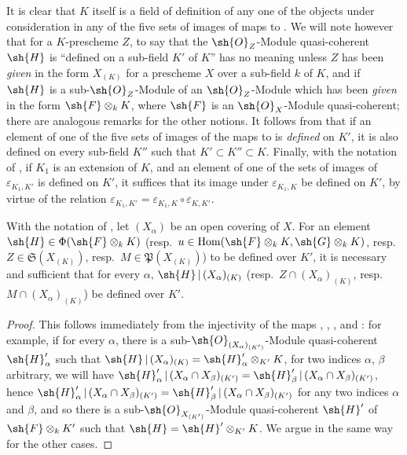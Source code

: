 It is clear that $K$ itself is a field of definition of any one of the objects under consideration in any of the five sets of images of maps  to .
We will note however that for a $K$-prescheme $Z$, to say that the $\sh{O}_Z$-Module quasi-coherent $\sh{H}$ is ``defined on a sub-field $K'$ of $K$'' has no meaning unless $Z$ has been \emph{given} in the form $X_{(K)}$ for a prescheme $X$ over a sub-field $k$ of $K$, and if $\sh{H}$ is a sub-$\sh{O}_Z$-Module of an $\sh{O}_Z$-Module which has been \emph{given} in the form $\sh{F}\otimes_k K$, where $\sh{F}$ is an $\sh{O}_X$-Module quasi-coherent; there are analogous remarks for the other notions.
It follows from  that if an element of one of the five sets of images of the maps  to  is \emph{defined} on $K'$, it is also defined on every sub-field $K''$ such that $K'\subset K''\subset K$.
Finally, with the notation of , if $K_1$ is an extension of $K$, and an element of one of the sets of images of $\varepsilon_{K_1,K'}$ is defined on $K'$, it suffices that its image under $\varepsilon_{K_1,K}$ be defined on $K'$, by virtue of the relation $\varepsilon_{K_1,K'} = \varepsilon_{K_1,K}\circ\varepsilon_{K,K'}$.

\begin{proposition}[4.8.5]
\label{IV.4.8.5}
With the notation of , let $(X_\alpha)$ be an open covering of $X$.
For an element $\sh{H}\in\Phi(\sh{F}\otimes_k K)$ (resp.\ $u\in\operatorname{Hom}(\sh{F}\otimes_k K, \sh{G}\otimes_k K)$, resp.\ $Z\in\mathfrak{S}(X_{(K)})$, resp.\ $M\in\mathfrak{P}(X_{(K)})$) to be defined over $K'$, it is necessary and sufficient that for every $\alpha$, $\sh{H}\,|\,(X_\alpha)_{(K)}$ (resp.\ $Z\cap(X_\alpha)_{(K)}$, resp.\ $M\cap(X_\alpha)_{(K)}$) be defined over $K'$.
\end{proposition}

\begin{proof}
This follows immediately from the injectivity of the maps , , , and : for example, if for every $\alpha$, there is a sub-$\sh{O}_{(X_\alpha)_{(K')}}$-Module quasi-coherent $\sh{H}'_\alpha$ such that $\sh{H}\,|\,(X_\alpha)_{(K)} = \sh{H}'_\alpha\otimes_{K'} K$, for two indices $\alpha$, $\beta$ arbitrary, we will have $\sh{H}'_\alpha\,|\,(X_\alpha\cap X_\beta)_{(K')} = \sh{H}'_\beta\,|\,(X_\alpha\cap X_\beta)_{(K')}$, hence $\sh{H}'_\alpha\,|\,(X_\alpha\cap X_\beta)_{(K')} = \sh{H}'_\beta\,|\,(X_\alpha\cap X_\beta)_{(K')}$ for any two indices $\alpha$ and $\beta$, and so there is a sub-$\sh{O}_{X_{(K')}}$-Module quasi-coherent $\sh{H}'$ of $\sh{F}\otimes_k K'$ such that $\sh{H} = \sh{H}'\otimes_{K'} K$.
We argue in the same way for the other cases.
\end{proof}

